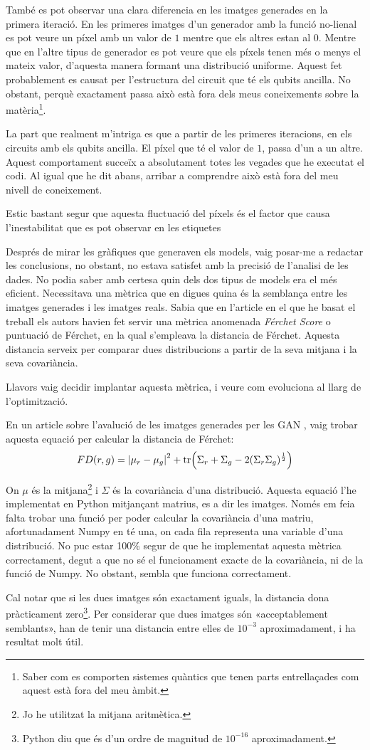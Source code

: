 També es pot observar una clara diferencia en les imatges generades en la primera iteració. En les primeres imatges d'un generador amb la funció no-lienal es pot veure un píxel amb un valor de $1$ mentre que els altres estan al $0$. Mentre que en l'altre tipus de generador es pot veure que els píxels tenen més o menys el mateix valor, d'aquesta manera formant una distribució uniforme. Aquest fet probablement es causat per l'estructura del circuit que té els qubits ancilla. No obstant, perquè exactament passa això està fora dels meus coneixements sobre la matèria\footnote{Saber com es comporten sistemes quàntics que tenen parts entrellaçades com aquest està fora del meu àmbit.}. 

La part que realment m'intriga es que a partir de les primeres iteracions, en els circuits amb els qubits ancilla. El píxel que té el valor de $1$, passa d'un a un altre. Aquest comportament succeïx a absolutament totes les vegades que he executat el codi. Al igual que he dit abans, arribar a comprendre això està fora del meu nivell de coneixement. 

Estic bastant segur que aquesta fluctuació del píxels és el factor que causa l'inestabilitat que es pot observar en les etiquetes

Després de mirar les gràfiques que generaven els models, vaig posar-me a redactar les conclusions, no obstant, no estava satisfet amb la precisió de l'analisi de les dades. No podia saber amb certesa quin dels dos tipus de models era el més eficient. Necessitava una mètrica que en digues quina és la semblança entre les imatges generades i les imatges reals. Sabia que en l'article en el que he basat el treball els autors havien fet servir una mètrica anomenada \textit{Férchet Score} o puntuació de Férchet, en la qual s'empleava la distancia de Férchet. Aquesta distancia serveix per comparar dues distribucions a partir de la seva mitjana i la seva covariància. 

Llavors vaig decidir implantar aquesta mètrica, i veure com evoluciona al llarg de l'optimització. 

En un article sobre l'avalució de les imatges generades per les GAN \cite{sd_score}, vaig trobar aquesta equació per calcular la distancia de Férchet:
$$
FD(r, g) = \abs{\mu_r - \mu_g}^2 + \tr(\Sigma_r + \Sigma_g -2(\Sigma_r\Sigma_g)^{\frac{1}{2}})
$$

On $\mu$ és la mitjana\footnote{Jo he utilitzat la mitjana aritmètica.} i $\Sigma$ és la covariància d'una distribució. Aquesta equació l'he implementat en Python mitjançant matrius, es a dir les imatges. Només em feia falta trobar una funció per poder calcular la covariància d'una matriu, afortunadament Numpy en té una, on cada fila representa una variable d'una distribució. No puc estar 100\% segur de que he implementat aquesta mètrica correctament, degut a que no sé el funcionament exacte de la covariància, ni de la funció de Numpy. No obstant, sembla que funciona correctament. 

Cal notar que si les dues imatges són exactament iguals, la distancia dona pràcticament zero\footnote{Python diu que és d'un ordre de magnitud de $10^{-16}$ aproximadament.}. Per considerar que dues imatges són «acceptablement semblants», han de tenir una distancia entre elles de $10^{-3}$ aproximadament, i ha resultat molt útil.